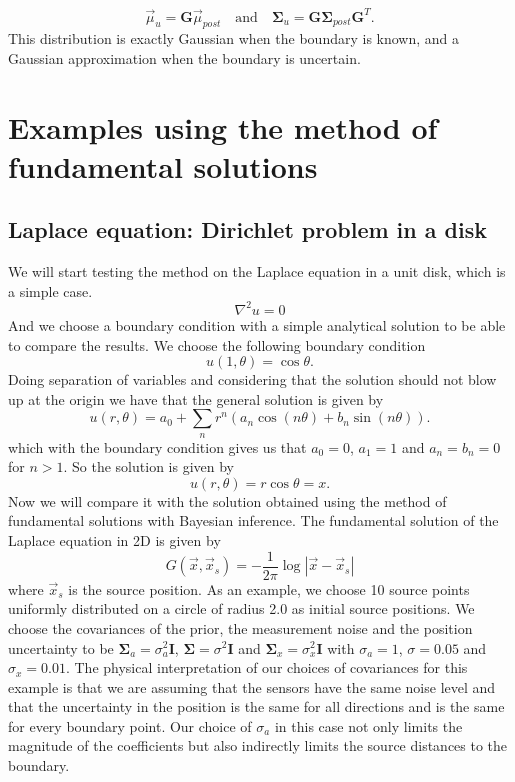 \documentclass{article}
\begin{document}
\begin{equation}
    \vec{\mu}_u = \mathbf{G} \vec{\mu}_{post} \quad \text{and} \quad  \mathbf{\Sigma}_u = \mathbf{G} \mathbf{\Sigma}_{post} \mathbf{G}^T.
\end{equation}
This distribution is exactly Gaussian when the boundary is known, and a Gaussian approximation when the boundary is uncertain.

\section{Examples using the method of fundamental solutions} \label{sec:examples}
\subsection{Laplace equation: Dirichlet problem in a disk}
We will start testing the method on the Laplace equation in a unit disk, which is a simple case.
\begin{equation}
    \nabla^2 u = 0 
\end{equation}
And we choose a boundary condition with a simple analytical solution to be able to compare the results. We choose the following boundary condition
\begin{equation}
    u(1,\theta)= \cos\theta.
    \end{equation}
Doing separation of variables and considering that the solution should not blow up at the origin we have that the general solution is given by
\begin{equation}
    u(r,\theta)=a_0 + \sum_n r^n(a_n \cos(n\theta) + b_n \sin(n\theta)).
\end{equation}
which with the boundary condition gives us that $a_0=0$, $a_1=1$ and $a_n=b_n=0$ for $n>1$. So the solution is given by
\begin{equation}
    u(r,\theta)= r \cos\theta=x.
\end{equation}
 Now we will compare it with the solution obtained using the method of fundamental solutions with Bayesian inference. The fundamental solution of the Laplace equation in 2D is given by
\begin{equation}
    G(\vec{x}, \vec{x}_s) = -\frac{1}{2\pi} \log |\vec{x}-\vec{x}_s|
\end{equation}
where $\vec{x}_s$ is the source position. As an example, we choose 10 source points uniformly distributed on a circle of radius 2.0 as initial source positions. We choose the covariances of the prior, the measurement noise and the position uncertainty to be $\mathbf{\Sigma}_a = \sigma_a^2 \mathbf{I}$, $\mathbf{\Sigma} = \sigma^2 \mathbf{I}$ and $\mathbf{\Sigma}_x = \sigma_x^2 \mathbf{I}$ with $\sigma_a=1$, $\sigma=0.05$ and $\sigma_x=0.01$. The physical interpretation of our choices of covariances for this example is that we are assuming that the sensors have the same noise level and that the uncertainty in the position is the same for all directions and is the same for every boundary point. Our choice of $\sigma_a$ in this case not only limits the magnitude of the coefficients but also indirectly limits the source distances to the boundary.
\end{document}
